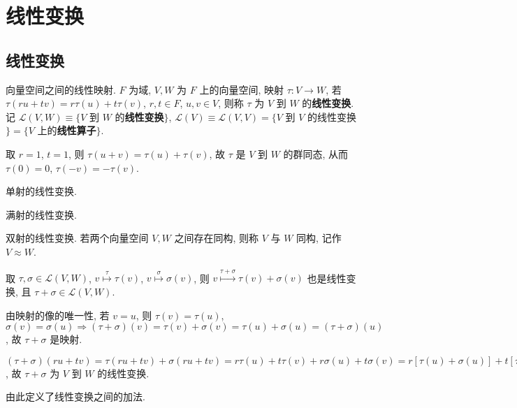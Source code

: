 \documentclass{note}
\begin{document}
\fi
\chapter{线性变换}
\section{线性变换}
\begin{df}[线性变换]
    向量空间之间的线性映射. $F$ 为域, $V,W$ 为 $F$ 上的向量空间, 映射 $\tau:V\rightarrow W$, 若 $\tau(ru+tv)=r\tau(u)+t\tau(v)$, $r,t\in F$, $u,v\in V$, 则称 $\tau$ 为 $V$ 到 $W$ 的\textbf{线性变换}.\\
    记 $\mathcal{L}(V,W)\equiv\{V$ 到 $W$ 的\textbf{线性变换}$\}$, $\mathcal{L}(V)\equiv\mathcal{L}(V,V)=\{V$ 到 $V$ 的线性变换$\}=\{V$ 上的\textbf{线性算子}$\}$.
\end{df}

取 $r=1$, $t=1$, 则 $\tau(u+v)=\tau(u)+\tau(v)$, 故 $\tau$ 是 $V$ 到 $W$ 的群同态, 从而 $\tau(0)=0$, $\tau(-v)=-\tau(v)$.

\begin{df}[单线性变换]
    单射的线性变换.
\end{df}

\begin{df}[满线性变换]
    满射的线性变换.
\end{df}

\begin{df}[同构]
    双射的线性变换. 若两个向量空间 $V,W$ 之间存在同构, 则称 $V$ 与 $W$ 同构, 记作 $V\approx W$.
\end{df}

取 $\tau,\sigma\in\mathcal{L}(V,W)$, $v\overset{\tau}{\mapsto}\tau(v)$, $v\overset{\sigma}{\mapsto}\sigma(v)$, 则 $v\overset{\tau+\sigma}{\mapsto}\tau(v)+\sigma(v)$ 也是线性变换, 且 $\tau+\sigma\in\mathcal{L}(V,W)$.
\begin{pf}
    由映射的像的唯一性, 若 $v=u$, 则 $\tau(v)=\tau(u)$, $\sigma(v)=\sigma(u)\Longrightarrow(\tau+\sigma)(v)=\tau(v)+\sigma(v)=\tau(u)+\sigma(u)=(\tau+\sigma)(u)$, 故 $\tau+\sigma$ 是映射.

    $(\tau+\sigma)(ru+tv)=\tau(ru+tv)+\sigma(ru+tv)=r\tau(u)+t\tau(v)+r\sigma(u)+t\sigma(v)=r[\tau(u)+\sigma(u)]+t[\tau(v)+\sigma(v)]=r(\tau+\sigma)(u)+t(\tau+\sigma)(v)$, 故 $\tau+\sigma$ 为 $V$ 到 $W$ 的线性变换.
\end{pf}
由此定义了线性变换之间的加法.
\end{document}
